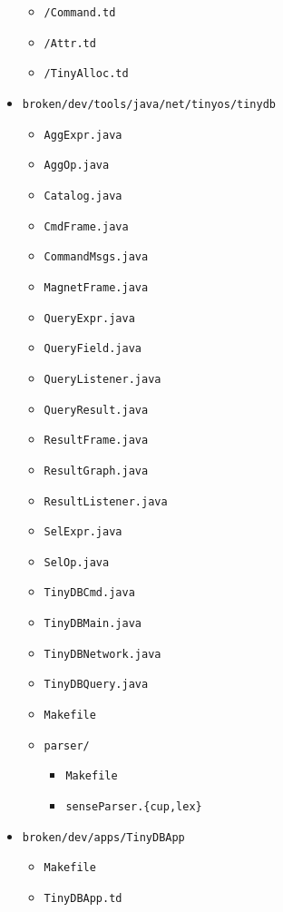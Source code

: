 \documentclass[11pt]{article}
\renewcommand{\baselinestretch}{1.2}
\newcommand{\docroot}{broken/dev}
\newcommand{\java}{broken/dev/tools/java}
\begin{document}
\begin{itemize}
\begin{itemize}
\item {\tt /Command.td}
\item {\tt /Attr.td}
\item {\tt /TinyAlloc.td}
\end{itemize}
\item {\tt {\java}/net/tinyos/tinydb}
\begin{itemize}
\item {\tt AggExpr.java}
\item {\tt AggOp.java}
\item {\tt Catalog.java}
\item {\tt CmdFrame.java}
\item {\tt CommandMsgs.java}
\item {\tt MagnetFrame.java}
\item {\tt QueryExpr.java}
\item {\tt QueryField.java}
\item {\tt QueryListener.java}
\item {\tt QueryResult.java}
\item {\tt ResultFrame.java}
\item {\tt ResultGraph.java}
\item {\tt ResultListener.java}
\item {\tt SelExpr.java}
\item {\tt SelOp.java}
\item {\tt TinyDBCmd.java}
\item {\tt TinyDBMain.java}
\item {\tt TinyDBNetwork.java}
\item {\tt TinyDBQuery.java}
\item {\tt Makefile}
\item {\tt parser/}
\begin{itemize}
\item {\tt Makefile}
\item {\tt senseParser.\{cup,lex\}}
\end{itemize}
\end{itemize}
\item {\tt {\docroot}/apps/TinyDBApp}
\begin{itemize}
\item {\tt Makefile}
\item {\tt TinyDBApp.td}
\end{itemize}
\end{itemize}
\renewcommand{\baselinestretch}{1.2}\rm
\end{document}
